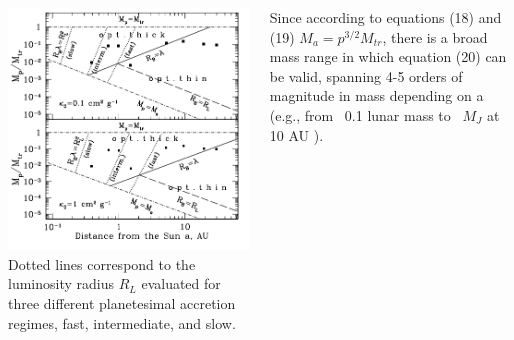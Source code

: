 \documentclass{beamer}
\begin{document}
\begin{frame}
\begin{columns}[t] 
\begin{column}{0.6\textwidth} 
\vspace{-0.5cm}
\includegraphics[width=\textwidth]{mass_scale.png}
{\small Dotted lines correspond to the luminosity radius $R_L$ evaluated for three different planetesimal accretion regimes, fast, intermediate, and slow.}
\end{column} 
\begin{column}{0.4\textwidth}
Since according to equations (18) and (19) $M_a = p^{3/2} M_{tr}$, there is a broad mass range in which equation (20) can be valid, spanning 4-5 orders of magnitude in mass depending on a (e.g., from ~0.1 lunar mass to ~$M_J$ at 10 AU ). 
\end{column} 
\end{columns}
\end{frame}
\end{document}
